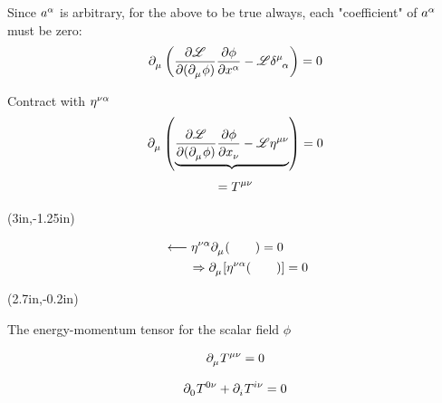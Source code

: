 \documentclass{article}
\begin{document}
\noindent Since $\tensor{a}{^\alpha}$ is arbitrary, for the above to be true always, each "coefficient" of $\tensor{a}{^\alpha}$ must be zero:
\begin{equation*}
    \tensor{\partial}{_\mu} \left( \dfrac{ \partial \mathscr{L} }{ \partial ( \tensor{\partial}{_\mu} \phi ) } \dfrac{ \partial \phi }{ \partial \tensor{x}{^\alpha} } - \mathscr{L} \tensor{\delta}{^\mu_\alpha} \right) = 0
\end{equation*}

\noindent Contract with $\tensor{\eta}{^\nu^\alpha}$
\begin{equation*}
    \tensor{\partial}{_\mu} \left( \underbrace{ \dfrac{ \partial \mathscr{L} }{ \partial ( \tensor{\partial}{_\mu} \phi ) } \dfrac{ \partial \phi }{ \partial \tensor{x}{_\nu} } - \mathscr{L} \tensor{\eta}{^\mu^\nu} } \right) = 0
\end{equation*}
\begin{equation*}
    = \tensor{T}{^\mu^\nu}
\end{equation*}

{%
\begin{textblock*}{2in}(3in,-1.25in)%
\begin{minipage}[h!]{2in}
    \begin{align*}
        &\longleftarrow \tensor{\eta}{^\nu^\alpha} \tensor{\partial}{_\mu} (\qquad) = 0 \\
        &\qquad \Rightarrow \tensor{\partial}{_\mu} [ \tensor{\eta}{^\nu^\alpha} (\qquad) ] = 0
    \end{align*}
\end{minipage}%
\end{textblock*}%
}
{%
\begin{textblock*}{2in}(2.7in,-0.2in)%
\begin{minipage}[h!]{2in}
    \noindent The energy-momentum tensor for the scalar field $\phi$
\end{minipage}%
\end{textblock*}%
}


\newpage

\begin{equation*}
    \tensor{\partial}{_\mu} \tensor{T}{^\mu^\nu} = 0
\end{equation*}

\begin{equation*}
    \tensor{\partial}{_0} \tensor{T}{^0^\nu} + \tensor{\partial}{_i} \tensor{T}{^i^\nu} = 0
\end{equation*}
\end{document}
